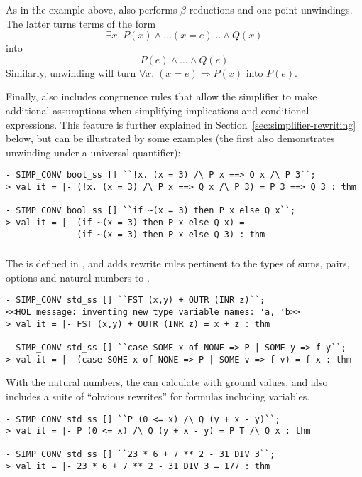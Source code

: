 As in the example above,  also performs
$\beta$-reductions and one-point unwindings.  The latter turns terms
of the form \[
\exists x.\;P(x)\land\dots (x = e) \dots\land Q(x)
\]
into
\[
P(e) \land \dots \land Q(e)
\]
Similarly, unwinding will turn $\forall x.\;(x = e)
\Rightarrow P(x)$ into $P(e)$.

Finally,  also includes congruence rules that allow
the simplifier to make additional assumptions when simplifying
implications and conditional expressions.  This feature is further
explained in Section~\ref{sec:simplifier-rewriting} below, but can be
illustrated by some examples (the first also demonstrates unwinding
under a universal quantifier):
\begin{session}
\begin{verbatim}
- SIMP_CONV bool_ss [] ``!x. (x = 3) /\ P x ==> Q x /\ P 3``;
> val it = |- (!x. (x = 3) /\ P x ==> Q x /\ P 3) = P 3 ==> Q 3 : thm

- SIMP_CONV bool_ss [] ``if ~(x = 3) then P x else Q x``;
> val it = |- (if ~(x = 3) then P x else Q x) =
              (if ~(x = 3) then P x else Q 3) : thm
\end{verbatim}
\end{session}

\subsubsection{}
%
%
The  \simpset{} is defined in , and adds
rewrite rules pertinent to the types of sums, pairs, options and
natural numbers to .
\begin{session}
\begin{verbatim}
- SIMP_CONV std_ss [] ``FST (x,y) + OUTR (INR z)``;
<<HOL message: inventing new type variable names: 'a, 'b>>
> val it = |- FST (x,y) + OUTR (INR z) = x + z : thm

- SIMP_CONV std_ss [] ``case SOME x of NONE => P | SOME y => f y``;
> val it = |- (case SOME x of NONE => P | SOME v => f v) = f x : thm
\end{verbatim}
\end{session}

With the natural numbers, the  \simpset{} can calculate
with ground values, and also includes a suite of ``obvious rewrites''
for formulas including variables.
\begin{session}
\begin{verbatim}
- SIMP_CONV std_ss [] ``P (0 <= x) /\ Q (y + x - y)``;
> val it = |- P (0 <= x) /\ Q (y + x - y) = P T /\ Q x : thm

- SIMP_CONV std_ss [] ``23 * 6 + 7 ** 2 - 31 DIV 3``;
> val it = |- 23 * 6 + 7 ** 2 - 31 DIV 3 = 177 : thm
\end{verbatim}
\end{session}


